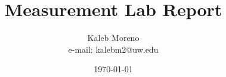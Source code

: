 \documentclass[a4paper,10pt]{article}
\begin{document}
\title{Measurement Lab Report}

\author{Kaleb Moreno \\ e-mail: kalebm2@uw.edu}

\date{\today}

\maketitle


\newpage

\tableofcontents

\pagebreak




\end{document}
